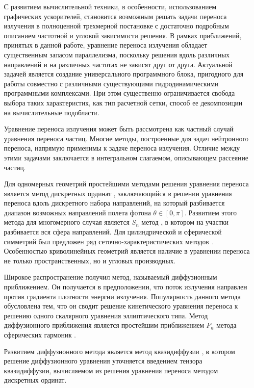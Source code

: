 С развитием вычислительной техники, в особенности, использованием графических ускорителей, становится возможным решать задачи переноса излучения в полноценной трехмерной постановке с достаточно подробным описанием частотной и угловой зависимости решения. В рамках приближений, принятых в данной работе, уравнение переноса излучения обладает существенным запасом параллелизма, поскольку решения вдоль различных направлений и на различных частотах не зависят друг от друга. Актуальной задачей является создание универсального программного блока, пригодного для работы совместно с различными существующими гидродинамическими программными комплексами. При этом существенно ограничивается свобода выбора таких характеристик, как тип расчетной сетки, способ ее декомпозиции на вычислительные подобласти.

{\develop} Уравнение переноса излучения может быть рассмотрена как частный случай уравнения переноса частиц. Многие методы, построенные для задач нейтронного переноса, напрямую применимы к задаче переноса излучения. Отличие между этими задачами заключается в интегральном слагаемом, описывающем рассеяние частиц.

Для одномерных геометрий простейшими методами решения уравнения переноса является метод дискретных ординат \cite{Wick1943,Chandrasekar1950}, заключающийся в решении уравнения переноса вдоль дискретного набора направлений, на который разбивается диапазон возможных направлений полета фотона $\theta \in [0, \pi]$. Развитием этого метода для многомерного случая является $S_n$ метод \cite{Carlson1953,Lathrop1965}, в котором на участки разбивается вся сфера направлений.
Для цилиндрической и сферической симметрий был предложен ряд сеточно-характеристических методов \cite{Vladimirov1958,Goldin1960}. Особенностью криволинейных геометрий является наличие в уравнении переноса не только пространственных, но и угловых производных.

Широкое распространение получил метод, называемый диффузионным приближением. Он получается в предположении, что поток излучения направлен против градиента плотности энергии излучения. Популярность данного метода обусловлена тем, что он сводит решение кинетического уравнения переноса к решению одного скалярного уравнения эллиптического типа. Метод диффузионного приближения является простейшим приближением $P_n$ метода сферических гармоник \cite{Marshak1947,vladimirov1961,Devison1960}.

Развитием диффузионного метода является метод квазидиффузии \cite{Goldin1964}, в котором решение диффузионного уравнения уточняется введением тензора квазидиффузии, вычисляемом из решения уравнения переноса методом дискретных ординат.

